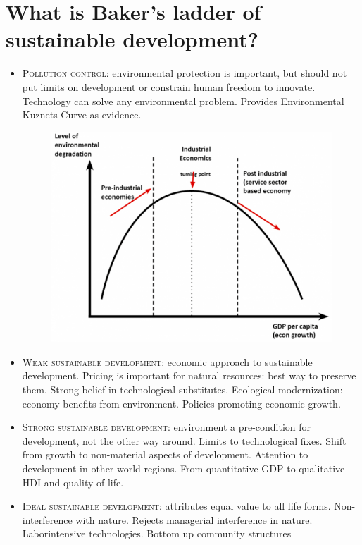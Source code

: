 \section{What is Baker's ladder of sustainable development?}
\begin{itemize}
\item \textsc{Pollution control:} environmental protection is important, but should not put limits on development or constrain human freedom to innovate. Technology can solve any environmental problem. Provides Environmental Kuznets Curve as evidence.

\begin{figure}[ht]
\begin{center}
\includegraphics[scale=0.75]{Kuznet}
\end{center}
\end{figure}

\item \textsc{Weak sustainable development:} economic approach to sustainable development. Pricing is important for natural resources: best way to preserve them. Strong belief in technological substitutes. Ecological modernization: economy benefits from environment. Policies promoting economic growth. 
\item \textsc{Strong sustainable development:} environment a pre-condition for development, not the other way around. Limits to technological fixes. Shift from growth to non-material aspects of development. Attention to development in other world regions. From quantitative GDP to qualitative HDI and quality of life. 
\item \textsc{Ideal sustainable development:} attributes equal value to all life forms. Non-interference with nature. Rejects managerial interference in nature. Laborintensive technologies. Bottom up community structures 
\end{itemize}

